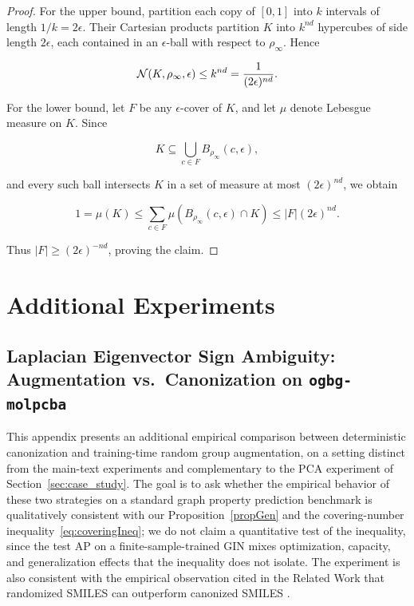\begin{proof}
For the upper bound, partition each copy of $[0,1]$ into $k$ intervals of length $1/k=2\epsilon$. Their Cartesian products partition $K$ into $k^{nd}$ hypercubes of side length $2\epsilon$, each contained in an $\epsilon$-ball with respect to $\rho_\infty$. Hence

$$
\mathcal{N}(K,\rho_\infty,\epsilon)\leq k^{nd}=\frac{1}{(2\epsilon)^{nd}}.
$$

For the lower bound, let $F$ be any $\epsilon$-cover of $K$, and let $\mu$ denote Lebesgue measure on $K$. Since

$$
K\subseteq\bigcup_{c\in F}B_{\rho_\infty}(c,\epsilon),
$$

and every such ball intersects $K$ in a set of measure at most $(2\epsilon)^{nd}$, we obtain

$$
1=\mu(K)\leq\sum_{c\in F}\mu(B_{\rho_\infty}(c,\epsilon)\cap K)
\leq |F|(2\epsilon)^{nd}.
$$

Thus $|F|\geq(2\epsilon)^{-nd}$, proving the claim.
\end{proof}



\section{Additional Experiments}
\label{sec:add_exp}


\subsection{Laplacian Eigenvector Sign Ambiguity: Augmentation vs.\ Canonization on \texttt{ogbg-molpcba}}
\label{subsec:lpe_molpcba}

This appendix presents an additional empirical comparison between deterministic
canonization and training-time random group augmentation, on a setting
distinct from the main-text experiments and complementary to the PCA
experiment of Section~\ref{sec:case_study}. The goal is to ask whether the empirical behavior of these two strategies on a standard graph property prediction benchmark is qualitatively consistent with our Proposition~\ref{propGen} and the covering-number inequality~\eqref{eq:coveringIneq}; we do not claim a quantitative test of the inequality, since the test AP on a finite-sample-trained GIN mixes optimization, capacity, and
generalization effects that the inequality does not isolate. The experiment is also consistent with the empirical observation cited in the Related Work that randomized SMILES can outperform canonized SMILES \cite{ArusPous2019,Bjerrum2017SMILESEA}.

